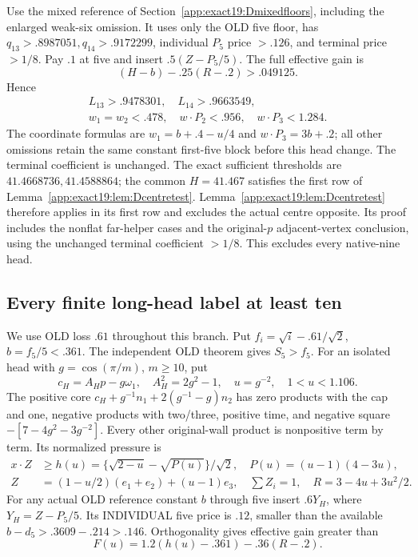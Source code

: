 \documentclass[11pt]{article}
\theoremstyle{definition}
\theoremstyle{remark}
\begin{document}
Use the mixed reference of
Section~\ref{app:exact19:Dmixedfloors}, including the enlarged weak-six
omission. It uses only the OLD five floor, has
\(q_{13}>.8987051,q_{14}>.9172299\), individual \(P_5\) price \(>.126\),
and terminal price \(>1/8\).
Pay \(.1\) at five and insert \(.5(Z-P_5/5)\).
The full effective gain is
\[
                  (H-b)-.25(R-.2)>.049125 .
\]
Hence
\[
\begin{gathered}
 L_{13}>.9478301,\quad L_{14}>.9663549,\\
 w_1=w_2<.478,\quad w\cdot P_2<.956,\quad w\cdot P_3<1.284 .
\end{gathered}
\]
The coordinate formulas are \(w_1=b+.4-u/4\) and
\(w\cdot P_3=3b+.2\); all other omissions retain the same constant
first-five block before this head change.
The terminal coefficient is unchanged.
The exact sufficient thresholds are \(41.4668736,41.4588864\);
the common \(H=41.467\) satisfies the first row of
Lemma~\ref{app:exact19:lem:Dcentretest}.
Lemma~\ref{app:exact19:lem:Dcentretest} therefore applies in its first row
and excludes the actual centre opposite. Its proof includes the nonflat
far-helper cases and the original-$p$ adjacent-vertex conclusion, using
the unchanged terminal coefficient $>1/8$.
This excludes every native-nine head.

\subsection{Every finite long-head label at least ten}
\label{app:exact19:Dlargefinite}

We use OLD loss \(.61\) throughout this branch.
Put \(f_i=\sqrt i-.61/\sqrt2\), \(b=f_5/5<.361\).
The independent OLD theorem gives \(S_5>f_5\).
For an isolated head with \(g=\cos(\pi/m)\), \(m\ge10\), put
\[
 c_H=A_Hp-g\omega_1,\quad A_H^2=2g^2-1,\quad
                          u=g^{-2},\quad 1<u<1.106 .
\]
The positive core \(c_H+g^{-1}n_1+2(g^{-1}-g)n_2\) has zero products
with the cap and one, negative products with two/three, positive time,
and negative square \(-[7-4g^2-3g^{-2}]\).
Every other original-wall product is nonpositive term by term.
Its normalized pressure is
\[
\begin{split}
 x\cdot Z&\ge h(u)=\{\sqrt{2-u}-\sqrt{P(u)}\}/\sqrt2,\quad
                               P(u)=(u-1)(4-3u),\\
 Z&=(1-u/2)(e_1+e_2)+(u-1)e_3,\quad\sum Z_i=1,\quad
                               R=3-4u+3u^2/2 .
\end{split}
\]
For any actual OLD reference constant \(b\) through five insert
\(.6Y_H\), where \(Y_H=Z-P_5/5\).
Its INDIVIDUAL five price is \(.12\), smaller than the available
\(b-d_5>.3609-.214>.146\).
Orthogonality gives effective gain greater than
\[
                   F(u)=1.2(h(u)-.361)-.36(R-.2).
\tag{D19largegain}\label{app:exact19:eq:Dlargegain}
\]
\end{document}
